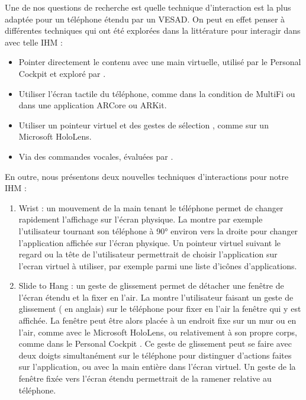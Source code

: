 Une de nos questions de recherche  est quelle technique d'interaction est la plus adaptée pour un téléphone étendu par un VESAD. On peut en effet penser à différentes techniques qui ont été explorées dans la littérature pour interagir dans avec telle IHM :

\begin{itemize}
  \item Pointer directement le contenu avec une main virtuelle, utilisé par le Personal Cockpit \cite{Ens2014} et exploré par \cite{Piumsomboon2013}.
  \item Utiliser l'écran tactile du téléphone, comme dans la condition  de MultiFi \citep{Grubert2015} ou dans une application ARCore ou ARKit.
  \item Utiliser un pointeur virtuel et des gestes de sélection \cite{Wilson2006}, comme sur un Microsoft HoloLens.
  \item Via des commandes vocales, évaluées par \cite{Piumsomboon2014}.
\end{itemize}
\bigskip


En outre, nous présentons deux nouvelles techniques d'interactions pour notre IHM :
\begin{enumerate}
  \item Wrist : un mouvement de la main tenant le téléphone permet de changer rapidement l'affichage sur l'écran physique. La  montre par exemple l'utilisateur tournant son téléphone à \ang{90} environ vers la droite pour changer l'application affichée sur l'écran physique. Un pointeur virtuel suivant le regard ou la tête de l'utilisateur permettrait de choisir l'application sur l'ecran virtuel à utiliser, par exemple parmi une liste d'icônes d'applications.
  \item Slide to Hang : un geste de glissement permet de détacher une fenêtre de l'écran étendu et la fixer en l'air. La  montre l'utilisateur faisant un geste de glissement ( en anglais) sur le téléphone pour fixer en l'air la fenêtre qui y est affichée. La fenêtre peut être alors placée à un endroit fixe sur un mur ou en l'air, comme avec le Microsoft HoloLens, ou relativement à son propre corps, comme dans le Personal Cockpit \cite{Ens2014}. Ce geste de glissement peut se faire avec deux doigts simultanément sur le téléphone pour distinguer d'actions faites sur l'application, ou avec la main entière dans l'écran virtuel. Un geste de la fenêtre fixée vers l'écran étendu permettrait de la ramener relative au téléphone.
\end{enumerate}
